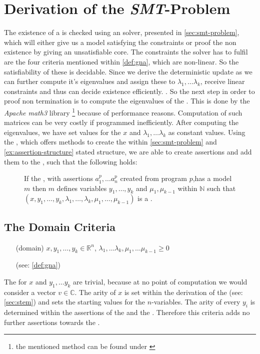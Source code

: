 \section{Derivation of the \emph{SMT}-Problem}
\label{sec:derivation-smt}
The existence of a \gna is checked using an  solver, presented in \autoref{sec:smt-problem}, which will either give us a model satisfying the constraints or proof the non existence by giving an unsatisfiable core. \newline
The constraints the  solver has to fulfil are the four criteria mentioned within \autoref{def:gna}, which are non-linear. So the satisfiability of these is decidable. Since we derive the deterministic update as \updatematrix we can further compute it's eigenvalues and assign these to $\lambda_1, \dots \lambda_k$, receive linear constraints and thus can decide existence efficiently. \cite{leike2014geometric}.%
\newline
So the next step in order to proof non termination is to compute the eigenvalues of the \updatematrix. This is done by the \textit{Apache math3} library \footnote{the mentioned method can be found under \cite{ApacheMath3}}  because of performance reasons. Computation of such matrices can be very costly if programmed inefficiently. %
After computing the eigenvalues, we have set values for the \stem $x$ and $\lambda_1, \dots \lambda_k$ as constant values.
\newline
Using the \smtfactory, which offers methods to create the within \autoref{sec:smt-problem} and \autoref{ex:assertion-structure} stated structure, we are able to create assertions and add them to the \solver, such that the following holds:
\begin{figure}[H]
	\centering
	If the \solver, with assertions $a^p_1, \dots a^p_n$ created from program $p$,has a model $m$ \newline
	then $m$ defines variables $y_1, \dots, y_k$ and $\mu_1, \mu_{k-1}$ within $\mathbb{N}$ such that \newline
	$(x, y_1, \dots, y_k, \lambda_1, \dots, \lambda_k, \mu_1, \dots, \mu_{k-1})$ is a \gna.
\end{figure}

\subsection{The Domain Criteria}
\begin{itemize}
	\setlength{\itemindent}{1in}
	\item[(domain)] $x, y_1, \dots, y_k \in \mathbb{R}^n$, $\lambda_1, \dots \lambda_k, \mu_1, \dots \mu_{k-1} \ge 0$
	\item[] (see: \autoref{def:gna})
\end{itemize}
The \domc for $x$ and $y_1, \dots y_k$ are trivial, because at no point of computation we would consider a vector $v\in\mathbb{C}$.
The arity of $x$ is set within the derivation of the \stem (see: \autoref{sec:stem}) and sets the starting values for the $n$-variables. The arity of every $y_i$ is determined within the assertions of the \pointc and the \rayc.\newline
Therefore this criteria adds no further assertions towards the \solver.
